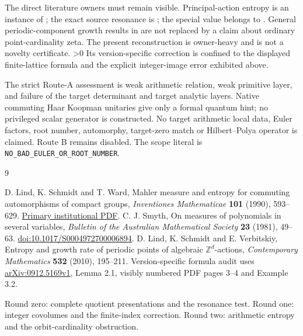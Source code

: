 \documentclass[10pt]{article}
\newcommand{\Z}{\mathbb Z}
\begin{document}
The direct literature owners must remain visible. Principal-action entropy
is an instance of \cite{lsw}; the exact source resonance is
\cite[Example 3.2]{lsv}; the special value belongs to \cite{smyth}.
General periodic-component growth results in \cite[Theorem 1.2]{lsv}
are not replaced by a claim about ordinary point-cardinality zeta.
The present reconstruction is owner-heavy and is not a novelty certificate.
\ifnum\CRevisionRound>0
Its version-specific correction is confined to the displayed finite-lattice
formula and the explicit integer-image error exhibited above.
\fi

\begin{samepage}
The strict Route-A assessment is weak arithmetic relation, weak primitive
layer, and failure of the target determinant and target analytic layers.
Native commuting Haar Koopman unitaries give only a formal quantum hint;
no privileged scalar generator is constructed. No target arithmetic local
data, Euler factors, root number, automorphy, target-zero match or
Hilbert--Polya operator is claimed. Route B remains disabled.
The scope literal is \texttt{NO\_BAD\_EULER\_OR\_ROOT\_NUMBER}.
\end{samepage}

\begin{thebibliography}{9}\raggedright
{} D. Lind, K. Schmidt and T. Ward,
Mahler measure and entropy for commuting automorphisms of compact groups,
\emph{Inventiones Mathematicae} \textbf{101} (1990), 593--629.
\href{https://ueaeprints.uea.ac.uk/id/eprint/18590/1/mahlerentropy.pdf}{Primary institutional PDF}.
 C. J. Smyth,
On measures of polynomials in several variables,
\emph{Bulletin of the Australian Mathematical Society} \textbf{23} (1981), 49--63.
\href{https://doi.org/10.1017/S0004972700006894}{doi:10.1017/S0004972700006894}.
 D. Lind, K. Schmidt and E. Verbitskiy,
Entropy and growth rate of periodic points of algebraic $\Z^d$-actions,
\emph{Contemporary Mathematics} \textbf{532} (2010), 195--211.
Version-specific formula audit uses
\href{https://arxiv.org/abs/0912.5169v1}{arXiv:0912.5169v1}, Lemma 2.1,
visibly numbered PDF pages 3--4 and Example 3.2.
\end{thebibliography}
\smallskip\noindent\small
\ifcase\CRevisionRound
Round zero: complete quotient presentations and the resonance test.
\or
Round one: integer covolumes and the finite-index correction.
\else
Round two: arithmetic entropy and the orbit-cardinality obstruction.
\fi
\end{document}
